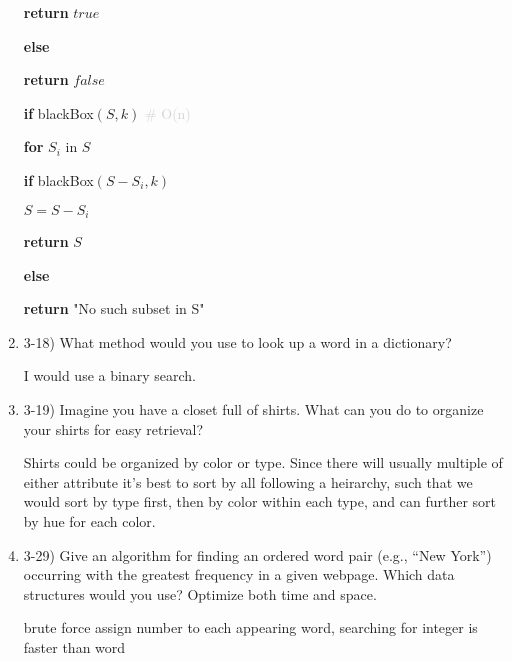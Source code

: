 \documentclass{article}
\begin{document}
\begin{enumerate}
{\begin{minipage}{0.8\textwidth}
    \quad \quad \textbf{return} $true$
    
    \quad \textbf{else}
        
    \quad \quad \textbf{return} $false$

    \textbf{if} blackBox$(S, k)$ \textcolor{lightgray}{ \# O(n)}
    
    \quad \textbf{for} $S_i$ in $S$

    \quad \quad \textbf{if} blackBox$(S - S_i, k)$

    \quad \quad \quad $S = S - S_i$

    \quad \textbf{return} $S$

    \textbf{else}

    \quad \textbf{return} "No such subset in S"

    \end{minipage}
    }

    \item 3-18) What method would you use to look up a word in a dictionary?
    
    I would use a binary search.
    
    \item 3-19) Imagine you have a closet full of shirts. What can you do to organize your shirts for easy retrieval?
    
    Shirts could be organized by color or type. Since there will usually multiple of either attribute it's best to sort by all following a heirarchy, such that we would sort by type first, then by color within each type, and can further sort by hue for each color.
    
    \item 3-29) Give an algorithm for finding an ordered word pair (e.g., “New York”) occurring with the greatest frequency in a given webpage. Which data structures would you use? Optimize both time and space. 

    brute force
    assign number to each appearing word, searching for integer is faster than word



\end{enumerate}
\end{document}
